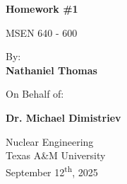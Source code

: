 \begin{titlepage}
    \begin{center}
        \vspace*{1cm}
            
        \Huge
        \textbf{Homework \#1}
            
        \vspace{0.5cm}
        \LARGE
        MSEN 640 - 600
            
        \vspace{1.5cm}
        
        By: \\

        \textbf{Nathaniel Thomas}

        On Behalf of:

        \textbf{Dr. Michael Dimistriev}

        \vfill

        \vspace{0.8cm}
            
        
            
        \Large
        Nuclear Engineering\\
        Texas A\&M University\\
        September 12\textsuperscript{th}, 2025
            
    \end{center}
\end{titlepage}
